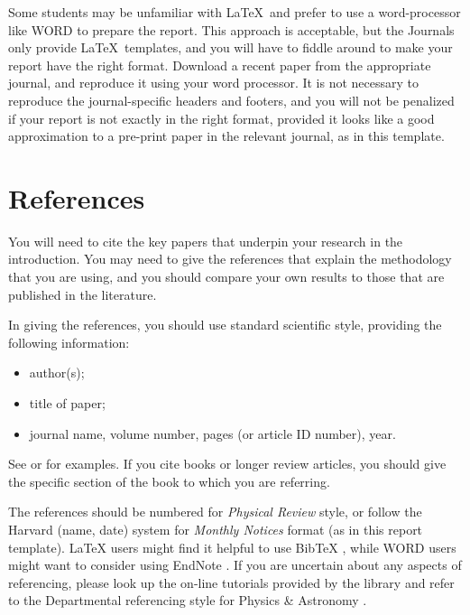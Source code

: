 \documentclass[a4paper,fleqn,usenatbib]{mnras}
\begin{document}
 Some students may be unfamiliar with  \LaTeX\ and prefer to use a word-processor like WORD to prepare the report. This approach is acceptable, but the Journals only provide \LaTeX\ templates, and you will have to fiddle around to make your report have the right format. Download a recent paper from the appropriate journal, and reproduce it using your word processor. It is not necessary to reproduce the journal-specific headers and footers, and you will not be penalized if your report is not exactly in the right format, provided it looks like a good approximation to a pre-print paper in the relevant journal, as in this template. 








\section{References}
\label{sec:refs}


 You will need to cite the key papers that underpin your research in the introduction. You may need to give the references that explain the methodology that you are using, and you should  compare your own results to those that are published in the literature.

In giving the references, you should use standard scientific style, providing the following information: 
\begin{itemize}
\item author(s);
\item title of paper;
\item journal name, volume number, pages (or article ID number), year.
\end{itemize}
See \citet{Dyson} or  \citet{Einstein} for examples. If you cite books \citep{good book} or longer review articles, you should give the specific section of the book to which you are referring. 


The references should be numbered for \textit{Physical Review} style, or follow the Harvard (name, date) system for  \textit{Monthly Notices} format (as in this report template). LaTeX users might find it helpful to use BibTeX \citep{BibteX}, while WORD users might want to consider using EndNote \citep{Endnote}.
If you are uncertain about any aspects of referencing, please look up the on-line tutorials provided by the library and refer to the Departmental referencing style for Physics \& Astronomy \citep{Referencing}. 
\end{document}
